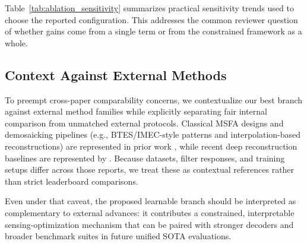\documentclass[journal]{IEEEtran}
\begin{document}
Table~\ref{tab:ablation_sensitivity} summarizes practical sensitivity trends used to choose the reported configuration. This addresses the common reviewer question of whether gains come from a single term or from the constrained framework as a whole.

\begin{table}[!t]
\caption{Sensitivity summary for key learnable-MSFA controls.}
\label{tab:ablation_sensitivity}
\centering
\footnotesize
\setlength{\tabcolsep}{3.0pt}
\end{table}

\subsection{Context Against External Methods}
To preempt cross-paper comparability concerns, we contextualize our best branch against external method families while explicitly separating fair internal comparison from unmatched external protocols. Classical MSFA designs and demosaicking pipelines (e.g., BTES/IMEC-style patterns and interpolation-based reconstructions) are represented in prior work 
\cite{miao2006,geelen2014,tsagkatakis2019}, while recent deep reconstruction baselines are represented by 
\cite{cheng2021,wu2021}. Because datasets, filter responses, and training setups differ across those reports, we treat these as contextual references rather than strict leaderboard comparisons.

Even under that caveat, the proposed learnable branch should be interpreted as complementary to external advances: it contributes a constrained, interpretable sensing-optimization mechanism that can be paired with stronger decoders and broader benchmark suites in future unified SOTA evaluations.
\end{document}
